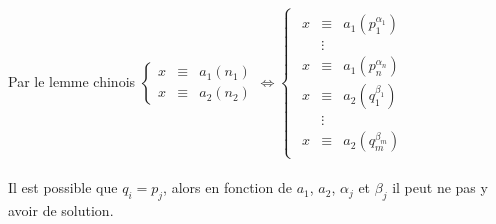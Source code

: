 \documentclass[a4paper,10pt]{book} %
\begin{document}
Par le lemme chinois $\left\{\begin{array}{rcl}x&\equiv &a_1(n_1)\\x&\equiv &a_2(n_2)\end{array}\right.\Leftrightarrow \left\{\begin{array}{c}\begin{array}{rcl}x&\equiv& a_1(p_1^{\alpha_1}) \\ &\vdots& \\ x&\equiv &a_1(p_n^{\alpha_n})\\
x&\equiv &a_2(q_1^{\beta_1}) \\ &\vdots& \\ x&\equiv& a_2(q_m^{\beta_m})\end{array}\end{array}\right.$\\\\

Il est possible que $q_i=p_j$, alors en fonction de $a_1$, $a_2$, $\alpha_j$ et $\beta_j$ il peut ne pas y avoir de solution.
\end{document}
